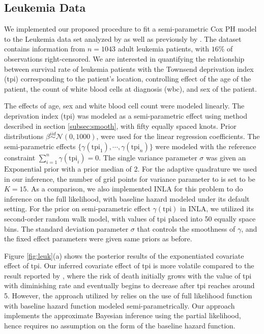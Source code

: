\documentclass[ba]{imsart}
\begin{document}
\subsection{Leukemia Data}\label{subsec:leuk}

We implemented our proposed procedure to fit a semi-parametric Cox PH model to the Leukemia data set analyzed by \cite{inlacoxph} as well as previously by \cite{spde,leukaemia}. The dataset contains information from $n=1043$ adult leukemia patients, with $16\%$ of observations right-censored. We are interested in quantifying the relationship between survival rate of leukemia patients with the Townsend deprivation index (tpi) corresponding to the patient's location, controlling effect of the age of the patient, the count of white blood cells at diagnosis (wbc), and sex of the patient.

The effects of age, sex and white blood cell count were modeled linearly. The deprivation index (tpi) was modeled as a semi-parametric effect using method described in section \ref{subsec:smooth}, with fifty equally spaced knots. Prior distributions $\beta \stackrel{iid}{\sim} \mathcal{N}(0, 1000)$, were used for the linear regression coefficients. The semi-parametric effects $\{\gamma(\text{tpi}_1), \cdots, \gamma(\text{tpi}_n)\}$ were modeled with the reference constraint $\sum_{i=1}^{n}\gamma(\text{tpi}_i) = 0$. The single variance parameter $\sigma$ was given an $\text{Exponential}$ prior with a prior median of 2. For the adaptive quadrature we used in our inference, the number of grid points for variance parameter to is set to be $K = 15$. As a comparison, we also implemented INLA for this problem to do inference on the full likelihood, with baseline hazard modeled under its default setting. For the prior on semi-parametric effect $\gamma(\text{tpi})$ in INLA, we utilized its second-order random walk model, with values of tpi placed into 50 equally space bins. The standard deviation parameter $\sigma$ that controls the smoothness of $\gamma$, and the fixed effect parameters were given same priors as before.

Figure \ref{fig:leuk}(a) shows the posterior results of the exponentiated covariate effect of tpi. Our inferred covariate effect of tpi is more volatile compared to the result reported by \cite{inlacoxph}, where the risk of death initially grows with the value of tpi with diminishing rate and eventually begins to decrease after tpi reaches around 5. However, the approach utilized by \cite{inlacoxph} relies on the use of full likelihood function with baseline hazard function modeled semi-parametrically. Our approach implements the approximate Bayesian inference using the partial likelihood, hence requires no assumption on the form of the baseline hazard function. 
\end{document}
